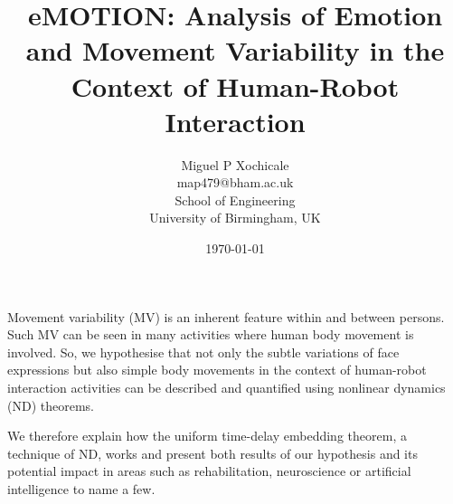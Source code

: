 \documentclass[12pt]{article}
\author{Miguel P Xochicale\\
map479@bham.ac.uk \\
School of Engineering\\
University of Birmingham, UK}
\title{
eMOTION: Analysis of Emotion and Movement Variability in the Context of Human-Robot Interaction
}
\date{\today}
\begin{document}
\maketitle

Movement variability (MV) is an inherent feature within and between persons.
Such MV can be seen in many activities where human body movement is involved. 
So, we hypothesise that not only the subtle 
variations of face expressions but also simple body movements 
in the context of human-robot interaction activities
can be described and quantified 
using nonlinear dynamics (ND) theorems.

We therefore explain how the uniform time-delay embedding theorem, a technique of ND, works 
and present both results of our hypothesis and its potential impact 
in areas such as 
rehabilitation, neuroscience or artificial intelligence to name a few.
\end{document}
